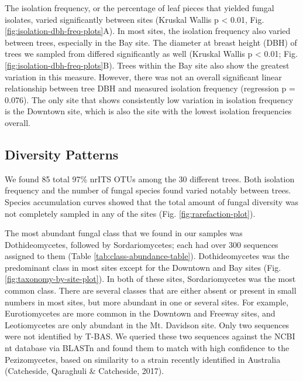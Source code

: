 \documentclass[fleqn,10pt,lineno]{wlpeerj} %
\begin{document}
The isolation frequency, or the percentage of leaf pieces that yielded fungal isolates, varied significantly between sites (Kruskal Wallis p \textless{} 0.01, Fig. \ref{fig:isolation-dbh-freq-plots}A). In most sites, the isolation frequency also varied between trees, especially in the Bay site. The diameter at breast height (DBH) of trees we sampled from differed significantly as well (Kruskal Wallis p \textless{} 0.01; Fig. \ref{fig:isolation-dbh-freq-plots}B). Trees within the Bay site also show the greatest variation in this measure. However, there was not an overall significant linear relationship between tree DBH and measured isolation frequency (regression p = 0.076). The only site that shows consistently low variation in isolation frequency is the Downtown site, which is also the site with the lowest isolation frequencies overall.

\hypertarget{diversity-patterns}{%
\subsection*{Diversity Patterns}\label{diversity-patterns}}

We found 85 total 97\% nrITS OTUs among the 30 different trees. Both isolation frequency and the number of fungal species found varied notably between trees. Species accumulation curves showed that the total amount of fungal diversity was not completely sampled in any of the sites (Fig. \ref{fig:rarefaction-plot}).

The most abundant fungal class that we found in our samples was Dothideomycetes, followed by Sordariomycetes; each had over 300 sequences assigned to them (Table \ref{tab:class-abundance-table}). Dothideomycetes was the predominant class in most sites except for the Downtown and Bay sites (Fig. \ref{fig:taxonomy-by-site-plot}). In both of these sites, Sordariomycetes was the most common class. There are several classes that are either absent or present in small numbers in most sites, but more abundant in one or several sites. For example, Eurotiomycetes are more common in the Downtown and Freeway sites, and Leotiomycetes are only abundant in the Mt. Davidson site. Only two sequences were not identified by T-BAS. We queried these two sequences against the NCBI nt database via BLASTn and found them to match with high confidence to the Pezizomycetes, based on similarity to a strain recently identified in Australia (Catcheside, Qaraghuli \& Catcheside, 2017).
\end{document}
